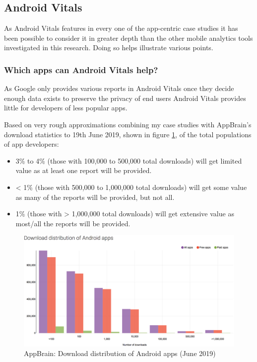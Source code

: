 \subsection{Android Vitals}
As Android Vitals features in every one of the app-centric case studies it has been possible to consider it in greater depth than the other mobile analytics tools investigated in this research. Doing so helps illustrate various points.

\subsubsection{Which apps can Android Vitals help?}
As Google only provides various reports in Android Vitals once they decide enough data exists to preserve the privacy of end users Android Vitals provides little for developers of less popular apps. 

Based on very rough approximations combining my case studies with AppBrain's download statistics to 19th June 2019, shown in figure \ref{fig:appbrain_download_statistics_jun_2019}\cite{appbrain_download_statistics_june_2019}, of the total populations of app developers:
\begin{itemize}
    \item 3\% to 4\% (those with 100,000 to 500,000 total downloads) will get limited value as at least one report will be provided.
    \item < 1\% (those with 500,000 to 1,000,000 total downloads) will get some value as many of the reports will be provided, but not all.
    \item 1\% (those with > 1,000,000 total downloads) will get extensive value as most/all the reports will be provided.
\end{itemize}

\begin{figure}[!htbp]
    \centering
    \includegraphics[width=\textwidth, keepaspectratio]{images/appbrain/AppBrain_Download_Statistics_20-Jun-2019.png}
    \caption{AppBrain: Download distribution of Android apps (June 2019)}
    \label{fig:appbrain_download_statistics_jun_2019}
\end{figure}

